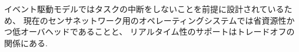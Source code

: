 イベント駆動モデルではタスクの中断をしないことを前提に設計されているため、
現在のセンサネットワーク用のオペレーティングシステムでは省資源性かつ低オーバヘッドであることと、
リアルタイム性のサポートはトレードオフの関係にある.






